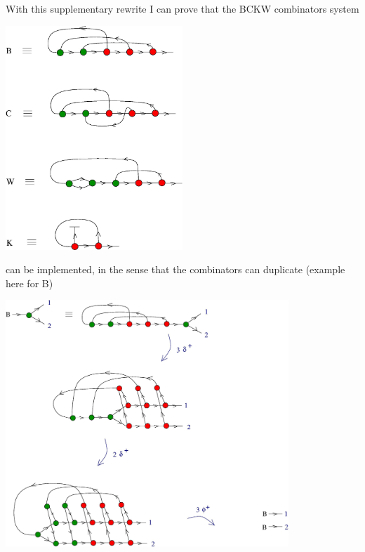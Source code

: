 \documentclass{article}
\begin{document}
\vspace{.5cm}
With this supplementary rewrite  I can prove that the BCKW combinators system



\vspace{.5cm}
 
\centerline{\includegraphics[width=0.5\textwidth]{../img/chemical-concrete-machine/bckw_2.jpg}
}
\vspace{.5cm}

can be implemented, in the sense that the combinators can duplicate (example here for B)



\vspace{.5cm}
 
\centerline{\includegraphics[width=0.8\textwidth]{../img/chemical-concrete-machine/bckw_3.jpg}
}
\vspace{.5cm}
\end{document}
